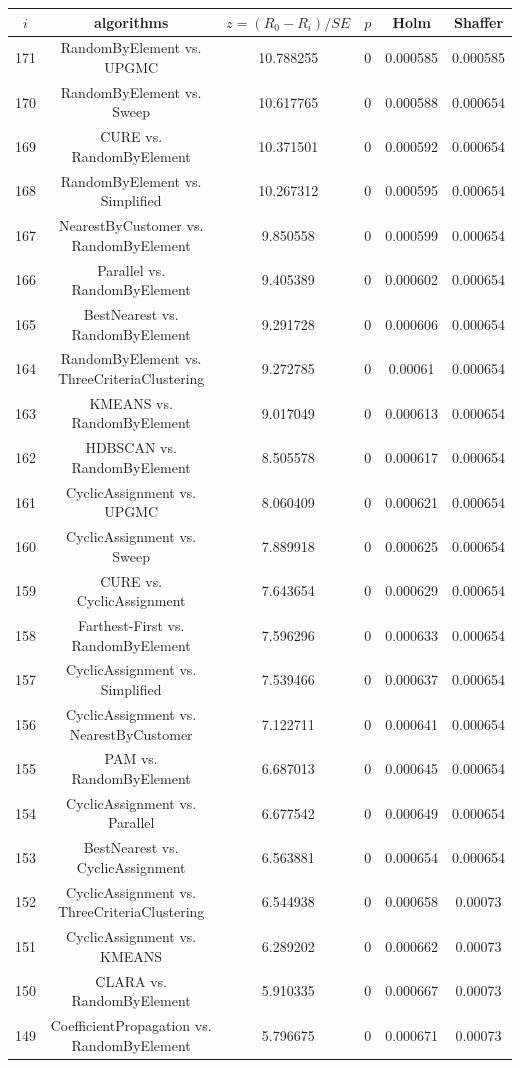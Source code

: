 \documentclass[a4paper,10pt]{article}
\begin{document}
\begin{landscape}
\begin{table}[!htp]
\centering\scriptsize
\begin{tabular}{cccccc}
$i$&algorithms&$z=(R_0 - R_i)/SE$&$p$&Holm&Shaffer\\
\hline171&RandomByElement vs. UPGMC&10.788255&0&0.000585&0.000585\\
170&RandomByElement vs. Sweep&10.617765&0&0.000588&0.000654\\
169&CURE vs. RandomByElement&10.371501&0&0.000592&0.000654\\
168&RandomByElement vs. Simplified&10.267312&0&0.000595&0.000654\\
167&NearestByCustomer vs. RandomByElement&9.850558&0&0.000599&0.000654\\
166&Parallel vs. RandomByElement&9.405389&0&0.000602&0.000654\\
165&BestNearest vs. RandomByElement&9.291728&0&0.000606&0.000654\\
164&RandomByElement vs. ThreeCriteriaClustering&9.272785&0&0.00061&0.000654\\
163&KMEANS vs. RandomByElement&9.017049&0&0.000613&0.000654\\
162&HDBSCAN vs. RandomByElement&8.505578&0&0.000617&0.000654\\
161&CyclicAssignment vs. UPGMC&8.060409&0&0.000621&0.000654\\
160&CyclicAssignment vs. Sweep&7.889918&0&0.000625&0.000654\\
159&CURE vs. CyclicAssignment&7.643654&0&0.000629&0.000654\\
158&Farthest-First vs. RandomByElement&7.596296&0&0.000633&0.000654\\
157&CyclicAssignment vs. Simplified&7.539466&0&0.000637&0.000654\\
156&CyclicAssignment vs. NearestByCustomer&7.122711&0&0.000641&0.000654\\
155&PAM vs. RandomByElement&6.687013&0&0.000645&0.000654\\
154&CyclicAssignment vs. Parallel&6.677542&0&0.000649&0.000654\\
153&BestNearest vs. CyclicAssignment&6.563881&0&0.000654&0.000654\\
152&CyclicAssignment vs. ThreeCriteriaClustering&6.544938&0&0.000658&0.00073\\
151&CyclicAssignment vs. KMEANS&6.289202&0&0.000662&0.00073\\
150&CLARA vs. RandomByElement&5.910335&0&0.000667&0.00073\\
149&CoefficientPropagation vs. RandomByElement&5.796675&0&0.000671&0.00073\\

\end{tabular}
\end{table}
\end{landscape}
\end{document}
